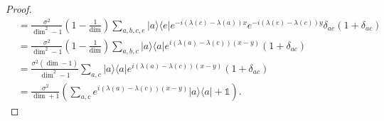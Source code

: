 \documentclass{article}
\newcommand{\ketbra}[2]{| #1\rangle\! \langle #2|}
\newcommand{\parens}[1]{\left( #1 \right)}
\newcommand{\identity}{\mathds{1}}
\begin{document}
\begin{proof}
\begin{align}
        &= \frac{\sigma^2}{\dim^2 - 1} \parens{1 - \frac{1}{\dim}} \sum_{a, b, c, e} \ketbra{a}{e} e^{-i (\lambda(c) - \lambda(a))x} e^{-i (\lambda(e) - \lambda(c))y} \delta_{ae} (1 + \delta_{ac}) \\
        &= \frac{\sigma^2}{\dim^2 - 1} \parens{1 - \frac{1}{\dim}} \sum_{a, b, c} \ketbra{a}{a} e^{i (\lambda(a) - \lambda(c))(x-y)} (1 + \delta_{ac}) \\
        &= \frac{\sigma^2 \parens{\dim - 1}}{\dim^2 - 1} \sum_{a,c} \ketbra{a}{a} e^{i (\lambda(a) - \lambda(c))(x - y)} (1 + \delta_{ac}) \\
        &= \frac{\sigma^2}{\dim + 1} \parens{\sum_{a,c} e^{i (\lambda(a) - \lambda(c))(x-y)} \ketbra{a}{a} + \identity}.
    \end{align}
\end{proof}
\end{document}
